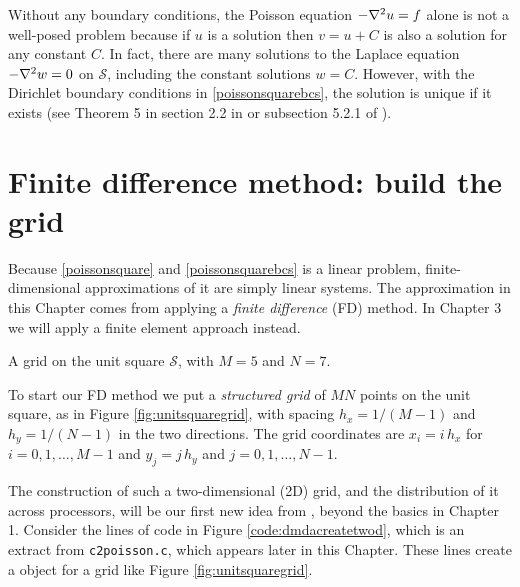 Without any boundary conditions, the Poisson equation $-\nabla^2 u = f$ alone is not a well-posed problem because if $u$ is a solution then $v=u+C$ is also a solution for any constant $C$.  In fact, there are many solutions to the Laplace equation $-\nabla^2 w = 0$ on $\mathcal{S}$, including the constant solutions $w=C$.  However, with the Dirichlet boundary conditions in \eqref{poissonsquarebcs}, the solution is unique if it exists (see Theorem 5 in section 2.2 in \citep{Evans} or subsection 5.2.1 of \citep{Ockendonetal2003}).


\section{Finite difference method: build the grid}

Because \eqref{poissonsquare} and \eqref{poissonsquarebcs} is a linear problem, finite-dimensional approximations of it are simply linear systems.  The approximation in this Chapter comes from applying a \emph{finite difference} (FD) method.  In Chapter 3 we will apply a finite element approach instead.

\begin{marginfigure}
\caption{A grid on the unit square $\mathcal{S}$, with $M=5$ and $N=7$.}
\label{fig:unitsquaregrid}
\end{marginfigure}

To start our FD method we put a \emph{structured grid} of $MN$ points on the unit square, as in Figure \ref{fig:unitsquaregrid}, with spacing $h_x=1/(M-1)$ and $h_y=1/(N-1)$ in the two directions.  The grid coordinates are $x_i = i\, h_x$ for $i = 0,1,\dots,M-1$ and $y_j = j\, h_y$ and $j=0,1,\dots,N-1$.

The construction of such a two-dimensional (2D) grid, and the distribution of it across processors, will be our first new idea from \PETSc, beyond the basics in Chapter 1.  Consider the lines of code in Figure \ref{code:dmdacreatetwod}, which is an extract from \texttt{c2poisson.c}, which appears later in this Chapter.  These lines create a \PETSc \pDM object for a grid like Figure \ref{fig:unitsquaregrid}.

